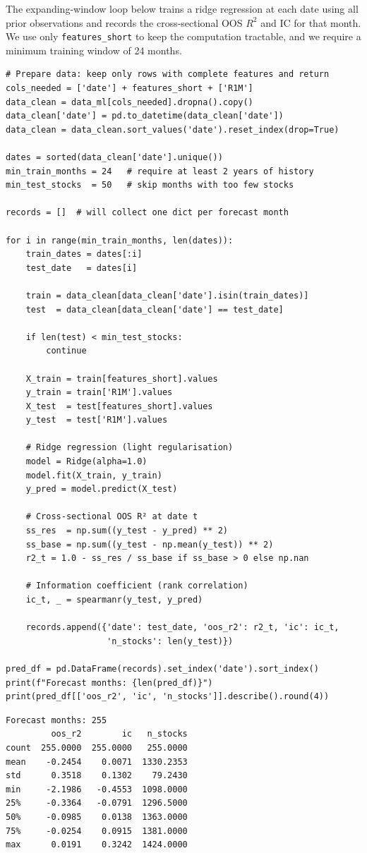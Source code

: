 The expanding-window loop below trains a ridge regression at each date using all prior observations and records the cross-sectional OOS $R^2$ and IC for that month. We use only \texttt{features\_short} to keep the computation tractable, and we require a minimum training window of 24 months.

\begin{verbatim}
# Prepare data: keep only rows with complete features and return
cols_needed = ['date'] + features_short + ['R1M']
data_clean = data_ml[cols_needed].dropna().copy()
data_clean['date'] = pd.to_datetime(data_clean['date'])
data_clean = data_clean.sort_values('date').reset_index(drop=True)

dates = sorted(data_clean['date'].unique())
min_train_months = 24   # require at least 2 years of history
min_test_stocks  = 50   # skip months with too few stocks

records = []  # will collect one dict per forecast month

for i in range(min_train_months, len(dates)):
    train_dates = dates[:i]
    test_date   = dates[i]

    train = data_clean[data_clean['date'].isin(train_dates)]
    test  = data_clean[data_clean['date'] == test_date]

    if len(test) < min_test_stocks:
        continue

    X_train = train[features_short].values
    y_train = train['R1M'].values
    X_test  = test[features_short].values
    y_test  = test['R1M'].values

    # Ridge regression (light regularisation)
    model = Ridge(alpha=1.0)
    model.fit(X_train, y_train)
    y_pred = model.predict(X_test)

    # Cross-sectional OOS R² at date t
    ss_res  = np.sum((y_test - y_pred) ** 2)
    ss_base = np.sum((y_test - np.mean(y_test)) ** 2)
    r2_t = 1.0 - ss_res / ss_base if ss_base > 0 else np.nan

    # Information coefficient (rank correlation)
    ic_t, _ = spearmanr(y_test, y_pred)

    records.append({'date': test_date, 'oos_r2': r2_t, 'ic': ic_t,
                    'n_stocks': len(y_test)})

pred_df = pd.DataFrame(records).set_index('date').sort_index()
print(f"Forecast months: {len(pred_df)}")
print(pred_df[['oos_r2', 'ic', 'n_stocks']].describe().round(4))
\end{verbatim}

\begin{verbatim}
Forecast months: 255
         oos_r2        ic   n_stocks
count  255.0000  255.0000   255.0000
mean    -0.2454    0.0071  1330.2353
std      0.3518    0.1302    79.2430
min     -2.1986   -0.4553  1098.0000
25%     -0.3364   -0.0791  1296.5000
50%     -0.0985    0.0138  1363.0000
75%     -0.0254    0.0915  1381.0000
max      0.0191    0.3242  1424.0000
\end{verbatim}

